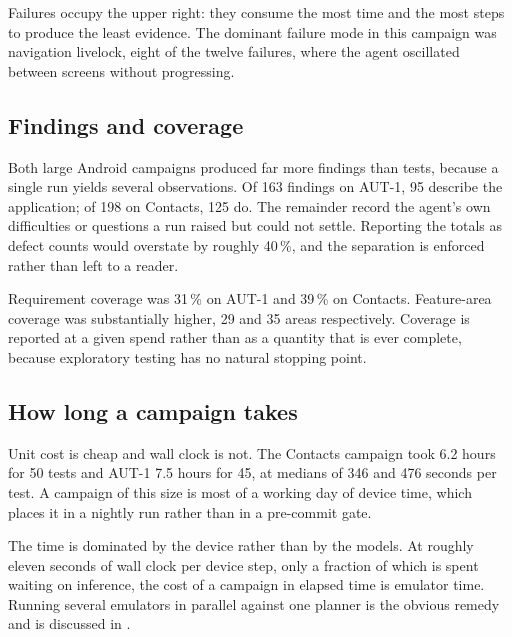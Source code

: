 Failures occupy the upper right: they consume the most time and the most steps
to produce the least evidence. The dominant failure mode in this campaign was
navigation livelock, eight of the twelve failures, where the agent oscillated
between screens without progressing.

\subsection{Findings and coverage}

Both large Android campaigns produced far more findings than tests, because a
single run yields several observations. Of 163 findings on AUT-1, 95
describe the application; of 198 on Contacts, 125 do. The remainder record the
agent's own difficulties or questions a run raised but could not settle.
Reporting the totals as defect counts would overstate by roughly 40\,\%, and
the separation is enforced rather than left to a reader.

Requirement coverage was 31\,\% on AUT-1 and 39\,\% on Contacts.
Feature-area coverage was substantially higher, 29 and 35 areas respectively.
Coverage is reported at a given spend rather than as a quantity that is ever
complete, because exploratory testing has no natural stopping point.

\subsection{How long a campaign takes}

Unit cost is cheap and wall clock is not. The Contacts campaign took 6.2 hours
for 50 tests and AUT-1 7.5 hours for 45, at medians of 346 and 476
seconds per test. A campaign of this size is most of a working day of device
time, which places it in a nightly run rather than in a pre-commit gate.

The time is dominated by the device rather than by the models. At roughly
eleven seconds of wall clock per device step, only a fraction of which is spent
waiting on inference, the cost of a campaign in elapsed time is emulator time.
Running several emulators in parallel against one planner is the obvious
remedy and is discussed in .
